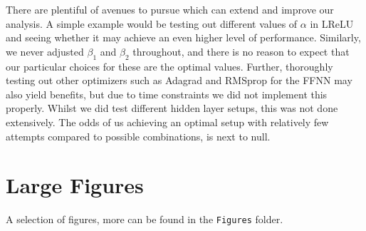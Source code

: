 \documentclass[%
reprint,s
amsmath,amssymb,
aps,
]{revtex4-2}
\begin{document}
There are plentiful of avenues to pursue which can extend and improve our analysis. A simple example would be testing out different values of $\alpha$ in LReLU and seeing whether it may achieve an even higher level of performance. Similarly, we never adjusted $\beta_1$ and $\beta_2$ throughout, and there is no reason to expect that our particular choices for these are the optimal values. Further, thoroughly testing out other optimizers such as Adagrad and RMSprop for the FFNN may also yield benefits, but due to time constraints we did not implement this properly. Whilst we did test different hidden layer setups, this was not done extensively. The odds of us achieving an optimal setup with relatively few attempts compared to possible combinations, is next to null. 




\appendix
\section{Large Figures}
\label{Appendix:A}
A selection of figures, more can be found in the \texttt{Figures} folder.

\end{document}
